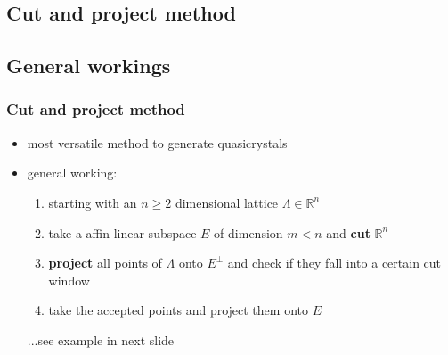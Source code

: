 \documentclass[]{beamer}
\begin{document}
\begin{frame}
  \section{Cut and project method}
  \subsection{General workings}
  \frametitle{Cut and project method}
  \begin{itemize}
    \item most versatile method to generate quasicrystals
    \item general working:
    \begin{enumerate}
      \item starting with an $n\geq2$ dimensional lattice $\Lambda\in \mathbb{R}^n$
      \item take a affin-linear subspace $E$ of dimension $m<n$ and \textbf{cut} $\mathbb{R}^n$
      \item \textbf{project} all points of $\Lambda$ onto $E^\perp$ and check if they fall into a certain cut window
      \item take the accepted points and project them onto $E$
    \end{enumerate}
    ...see example in next slide
  \end{itemize}
\end{frame}
\end{document}
